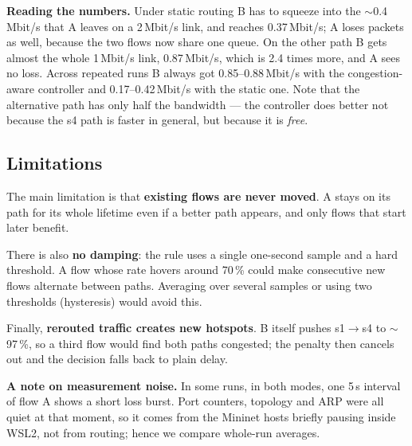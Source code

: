 \documentclass[11pt]{article}
\begin{document}
\textbf{Reading the numbers.} Under static routing B has to squeeze into the $\sim$0.4\,Mbit/s that A
leaves on a 2\,Mbit/s link, and reaches 0.37\,Mbit/s; A loses packets as well, because the two flows
now share one queue. On the other path B gets almost the whole 1\,Mbit/s link, 0.87\,Mbit/s, which is
2.4 times more, and A sees no loss. Across repeated runs B always got 0.85--0.88\,Mbit/s with the
congestion-aware controller and 0.17--0.42\,Mbit/s with the static one. Note that the alternative
path has only half the bandwidth --- the controller does better not because the s4 path is faster in
general, but because it is \emph{free}.

\subsection{Limitations}
The main limitation is that \textbf{existing flows are never moved}. A stays on its path for its whole
lifetime even if a better path appears, and only flows that start later benefit.

There is also \textbf{no damping}: the rule uses a single one-second sample and a hard threshold. A flow
whose rate hovers around 70\,\% could make consecutive new flows alternate between paths. Averaging
over several samples or using two thresholds (hysteresis) would avoid this.

Finally, \textbf{rerouted traffic creates new hotspots}. B itself pushes s1$\to$s4 to $\sim$97\,\%, so
a third flow would find both paths congested; the penalty then cancels out and the decision falls back
to plain delay.

\textbf{A note on measurement noise.} In some runs, in both modes, one 5\,s interval of flow A shows a
short loss burst. Port counters, topology and ARP were all quiet at that moment, so it comes from the
Mininet hosts briefly pausing inside WSL2, not from routing; hence we compare whole-run averages.
\end{document}
